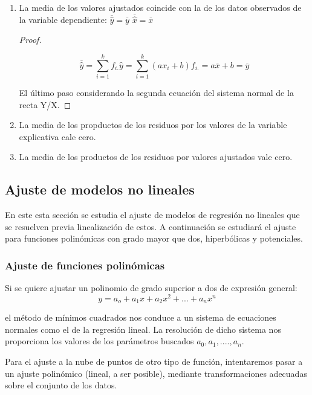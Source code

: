 \documentclass{article}
\begin{document}
\begin{enumerate}
\begin{proof}
	El último paso se hace considerando la segunda ecuación del sistema normal de recta de Y/X la cual es la siguiente:
	$$ \overline{y} = a\overline{x} + b $$
\end{proof}

\item La media de los valores ajustados coincide con la de los datos observados de la variable dependiente: $\overline{\hat{y}} = \overline{y} $ $\overline{\hat{x}} = \overline{x}$

\begin{proof}
$ $\newline

$$ \overline{\hat{y}} = \sum_{i=1}^kf_{i.} \hat{y}  = \sum_{i=1}^k(ax_i +b)f_{i.} = a\overline{x} +b = \overline{y} $$

El último paso considerando la segunda ecuación del sistema normal de la recta Y/X.
\end{proof}
\item La media de los propductos de los residuos por los valores de la variable explicativa cale cero.
\item La media de los productos de los residuos por valores ajustados vale cero.

\end{enumerate}

\subsection{Ajuste de modelos no lineales}

En este esta sección se estudia el ajuste de modelos de regresión no lineales que se resuelven previa linealización de estos. A continuación se estudiará el ajuste para funciones polinómicas con grado mayor que dos, hiperbólicas y potenciales.

\subsubsection{Ajuste de funciones polinómicas}

Si se quiere ajustar un polinomio de grado superior a dos de expresión general:
$$ y = a_o + a_1x +a_2x^2 + ... + a_nx^n $$

el método de mínimos cuadrados nos conduce a un sistema de ecuaciones normales como el de la regresión lineal. La resolución de dicho sistema nos proporciona los valores de los parámetros buscados $a_0, a_1, .... , a_n$.

	Para el ajuste a la nube de puntos de otro tipo de función, intentaremos pasar a un ajuste polinómico (lineal, a ser posible), mediante transformaciones adecuadas sobre el conjunto de los datos.
	
\end{document}
